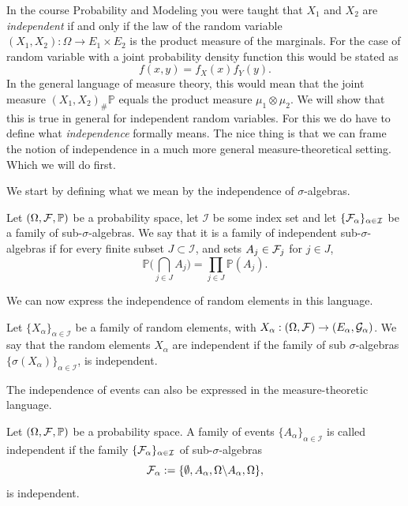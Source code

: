In the course Probability and Modeling you were taught that $X_1$ and $X_2$ are \emph{independent} if and only if the law of the random variable $(X_1, X_2): \Omega \to E_1\times E_2$ is the product measure of the marginals. For the case of random variable with a joint probability density function this would be stated as
\[
	f(x,y) = f_X(x) f_Y(y).
\] 
In the general language of measure theory, this would mean that the joint measure $(X_1, X_2)_\# \mathbb{P}$ equals the product measure $\mu_1 \otimes \mu_2$. We will show that this is true in general for independent random variables. For this we do have to define what \emph{independence} formally means. The nice thing is that we can frame the notion of independence in a much more general measure-theoretical setting. Which we will do first. 

We start by defining what we mean by the independence of $\sigma$-algebras.

\begin{definition}
	Let $(\Omega, \mathcal F, \mathbb{P})$ be a probability space, let $\mathcal{I}$ be some index set and let $\{\mathcal F_\alpha\}_{\alpha \in \mathcal{I}}$ be a family of sub-$\sigma$-algebras. We say that it is a family of independent sub-$\sigma$-algebras if for every finite subset $J \subset \mathcal{I}$, and sets $A_j\in \mathcal F_j$ for $j \in J$,
	\[
	\mathbb{P}\biggl( \bigcap_{j \in J} A_j \biggr) = \prod_{j \in J} \mathbb{P}(A_{j}).
	\]
\end{definition}

We can now express the independence of random elements in this language.

\begin{definition}\label{def:independent_rvs}
	Let $\{X_\alpha\}_{\alpha \in \mathcal{I}}$ be a family of random elements, with $X_\alpha:(\Omega, \mathcal F) \to (E_\alpha, \mathcal{G}_\alpha)$. We say that the random elements $X_\alpha$ are independent if the family of sub $\sigma$-algebras $\{\sigma(X_\alpha)\}_{\alpha \in \mathcal{I}}$, is independent.
\end{definition}

The independence of events can also be expressed in the measure-theoretic language.

\begin{definition}
	Let $(\Omega, \mathcal F, \mathbb{P})$ be a probability space. A family of events $\{A_\alpha\}_{\alpha \in \mathcal{I}}$ is called independent if the family $\{ \mathcal F_\alpha \}_{\alpha\in\mathcal{I}}$ of sub-$\sigma$-algebras
	\[
	\mathcal F_\alpha := \{ \emptyset, A_\alpha, \Omega \backslash A_\alpha, \Omega \},
	\]
	is independent.
\end{definition}

